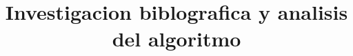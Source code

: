 \documentclass[11pt]{article}
\begin{document}
\title{Investigacion biblografica y analisis del algoritmo}
\maketitle
\end{document}

